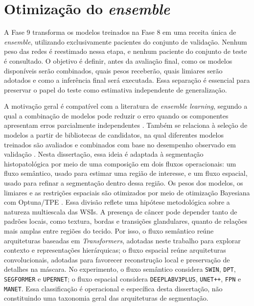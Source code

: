 \section{Otimização do \textit{ensemble}}\label{sec:met_otimizacao_ensemble}

A Fase 9 transforma os modelos treinados na Fase 8 em uma receita única de
\textit{ensemble}, utilizando exclusivamente pacientes do conjunto de validação.
Nenhum peso das redes é reestimado nessa etapa, e nenhum paciente do conjunto de
teste é consultado. O objetivo é definir, antes da avaliação final, como os
modelos disponíveis serão combinados, quais pesos receberão, quais limiares serão
adotados e como a inferência final será executada. Essa separação é essencial
para preservar o papel do teste como estimativa independente de generalização.

A motivação geral é compatível com a literatura de \textit{ensemble learning}, segundo a qual a combinação de modelos pode reduzir o erro quando os componentes apresentam erros parcialmente independentes \cite{dietterich2000ensemble}. Também se relaciona à seleção de modelos a partir de bibliotecas de candidatos, na qual diferentes modelos treinados são avaliados e combinados com base no desempenho observado em validação \cite{caruana2004ensemble}. Nesta dissertação, essa ideia é adaptada à segmentação histopatológica por meio de uma composição em dois fluxos operacionais: um fluxo semântico, usado para estimar uma região de interesse, e um fluxo espacial, usado para refinar a segmentação dentro dessa região. Os pesos dos modelos, os limiares e as restrições espaciais são otimizados por meio de otimização Bayesiana com Optuna/TPE \cite{akiba2019optuna,bergstra2011algorithms}. Essa divisão reflete uma hipótese metodológica sobre a natureza multiescala das WSIs. A presença de câncer pode depender tanto de padrões locais, como textura, bordas e transições glandulares, quanto de relações mais amplas entre regiões do tecido. Por isso, o fluxo semântico reúne arquiteturas baseadas em \textit{Transformers}, adotadas neste trabalho para explorar contexto e representações hierárquicas; o fluxo espacial reúne arquiteturas convolucionais, adotadas para favorecer reconstrução local e preservação de detalhes na máscara. No experimento, o fluxo semântico considera \texttt{SWIN}, \texttt{DPT}, \texttt{SEGFORMER} e \texttt{UPERNET}; o fluxo espacial considera \texttt{DEEPLABV3PLUS}, \texttt{UNET++}, \texttt{FPN} e \texttt{MANET}. Essa classificação é operacional e específica desta dissertação, não constituindo uma taxonomia geral das arquiteturas de segmentação.

